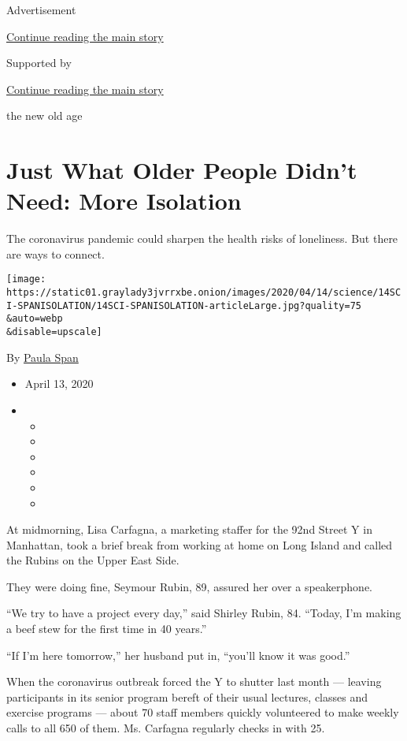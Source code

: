 Advertisement

\protect\hyperlink{after-top}{Continue reading the main story}

Supported by

\protect\hyperlink{after-sponsor}{Continue reading the main story}

the new old age

\hypertarget{just-what-older-people-didnt-need-more-isolation}{%
\section{Just What Older People Didn't Need: More
Isolation}\label{just-what-older-people-didnt-need-more-isolation}}

The coronavirus pandemic could sharpen the health risks of loneliness.
But there are ways to connect.

\texttt{[image: https://static01.graylady3jvrrxbe.onion/images/2020/04/14/science/14SCI-SPANISOLATION/14SCI-SPANISOLATION-articleLarge.jpg?quality=75\\\&auto=webp\\\&disable=upscale]}

By \href{https://www.nytimes3xbfgragh.onion/by/paula-span}{Paula Span}

\begin{itemize}
\item
  April 13, 2020
\item
  \begin{itemize}
  \item
  \item
  \item
  \item
  \item
  \item
  \end{itemize}
\end{itemize}

At midmorning, Lisa Carfagna, a marketing staffer for the 92nd Street Y
in Manhattan, took a brief break from working at home on Long Island and
called the Rubins on the Upper East Side.

They were doing fine, Seymour Rubin, 89, assured her over a
speakerphone.

``We try to have a project every day,'' said Shirley Rubin, 84. ``Today,
I'm making a beef stew for the first time in 40 years.''

``If I'm here tomorrow,'' her husband put in, ``you'll know it was
good.''

When the coronavirus outbreak forced the Y to shutter last month ---
leaving participants in its senior program bereft of their usual
lectures, classes and exercise programs --- about 70 staff members
quickly volunteered to make weekly calls to all 650 of them. Ms.
Carfagna regularly checks in with 25.


